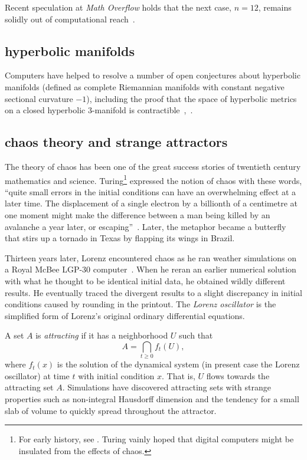 \documentclass{llncs}
\begin{document}
Recent speculation at {\it Math Overflow} holds that the next case,
$n=12$, remains solidly out of computational reach~\cite{Horn}.


\subsection{hyperbolic manifolds}

Computers have helped to resolve a number of open conjectures about
hyperbolic manifolds (defined as complete Riemannian manifolds with
constant negative sectional curvature $-1$), including the proof that
the space of hyperbolic metrics on a closed hyperbolic $3$-manifold is
contractible~\cite{GMT},~\cite{GabICM}.


\subsection{chaos theory and strange attractors}

The theory of chaos has been one of the great success stories of
twentieth century mathematics and science.   Turing\footnote{For
  early history, see \cite[p.~971]{Wolfram:NKS}. Turing vainly hoped that
  digital computers might be insulated from the effects of chaos.}
expressed the notion of chaos with these words, ``quite small errors
in the initial conditions can have an overwhelming effect at a later
time.  The displacement of a single electron by a billionth of a
centimetre at one moment might make the difference between a man being
killed by an avalanche a year later, or escaping''~\cite{Tu50}.
Later, the metaphor became a butterfly
that stirs up a tornado in Texas by flapping its wings in Brazil.

Thirteen years later, Lorenz encountered chaos as he ran weather
simulations on a Royal McBee LGP-30 computer~\cite{Lo63}.  When he
reran an earlier numerical solution with what he thought to be
identical initial data, he obtained wildly different results.  He
eventually traced the divergent results to a slight discrepancy in
initial conditions caused by rounding in the printout.  The {\it Lorenz
  oscillator} is the simplified form of Lorenz's original ordinary
differential equations.

A set $A$ is {\it attracting} if it has a neighborhood $U$ such
that
\[
A = \bigcap_{t\ge 0} f_t(U),
\]
where $f_t(x)$ is the solution of the dynamical system (in present
case the Lorenz oscillator) at time $t$ with initial condition
$x$. That is, $U$ flows towards the attracting set $A$.  Simulations
have discovered attracting sets with strange properties such as
non-integral Hausdorff dimension and the tendency for a small slab of 
volume to quickly spread throughout the attractor.
\end{document}
